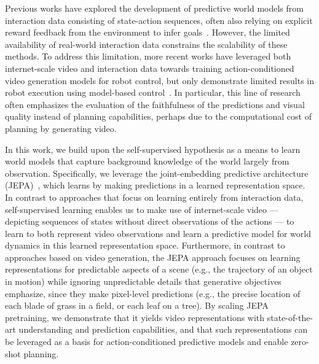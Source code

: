 \documentclass[]{kling/kling}
\begin{document}
Previous works have explored the development of predictive world models from interaction data consisting of state-action sequences, often also relying on explicit reward feedback from the environment to infer goals~\citep{sutton1981adaptive,fragkiadaki2015learning,ha2018world,hafner2019learning,hansen2022temporal}. However, the limited availability of real-world interaction data constrains the scalability of these methods.
To address this limitation, more recent works have leveraged both internet-scale video and interaction data towards training action-conditioned video generation models for robot control, but only demonstrate limited results in robot execution using model-based control~\citep{hu2023gaia,yang2024learning,bruce2024genie,agarwal2025cosmos}.
In particular, this line of research often emphasizes the evaluation of the faithfulness of the predictions and visual quality instead of planning capabilities, perhaps due to the computational cost of planning by generating video.

In this work, we build upon the self-supervised hypothesis as a means to learn world models that capture background knowledge of the world largely from observation. Specifically, we leverage the joint-embedding predictive architecture (JEPA)~\citep{lecun2022path}, which learns by making predictions in a learned representation space.
In contrast to approaches that focus on learning entirely from interaction data, self-supervised learning enables us to make use of internet-scale video --- depicting sequences of states without direct observations of the actions ---
to learn to both represent video observations and learn a predictive model for world dynamics in this learned representation space.
Furthermore, in contrast to approaches based on video generation, the JEPA approach focuses on learning representations for predictable aspects of a scene (e.g., the trajectory of an object in motion) while ignoring unpredictable details that generative objectives emphasize, since they make pixel-level predictions (e.g., the precise location of each blade of grass in a field, or each leaf on a tree).
By scaling JEPA pretraining, we demonstrate that it yields video representations with state-of-the-art understanding and prediction capabilities, and that such representations can be leveraged as a basis for action-conditioned predictive models and enable zero-shot planning.
\end{document}
